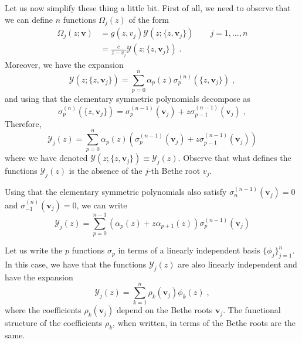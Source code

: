 \documentclass[a4paper,11pt]{amsart}
\begin{document}
Let us now simplify these thing a little bit. First of all, we need to
observe that we can define \(n\) functions \(\Omega_j(z)\) of the form 
\begin{equation}
\begin{split}
  \Omega_{j}(z; \bm{v}) & = g(z, v_j) \mathcal{Y}(z; \{z, \bm{v}_j\})\qquad j =1, \dots, n\\
   & = \frac{c}{z - v_j} \mathcal{Y}(z; \{z, \bm{v}_j\})\; .
\end{split}
\end{equation}
Moreover, we have the expansion 
\begin{equation}
  \mathcal{Y}(z; \{z,\bm{v}_j\}) = \sum_{p=0}^n \alpha_p(z) \sigma_p^{(n)}(\{z,\bm{v}_j\})\; , 
\end{equation}
and using that the elementary symmetric polynomials decompose as
\begin{equation}
  \sigma_p^{(n)}(\{z,\bm{v}_j\}) = \sigma_p^{(n-1)}(\bm{v}_j) + z \sigma_{p-1}^{(n-1)}(\bm{v}_j) \; , 
\end{equation}
Therefore,
\begin{equation}
  \label{eq:y-functions-alpha}
  \mathcal{Y}_j(z)  = 
\sum_{p=0}^{n} \alpha_p(z)
  \left(\sigma_p^{(n-1)}(\bm{v}_j) + z \sigma_{p-1}^{(n-1)}(\bm{v}_j) \right) 
\end{equation}
where we have denoted \( \mathcal{Y}(z; \{z,\bm{v}_j\}) \equiv \mathcal{Y}_j(z)\). 
Observe that what defines the functions \(\mathcal{Y}_j(z)\) is the absence of the
\(j\)-th Bethe root \(v_j\).

Using that the elementary symmetric polynomials also satisfy \(\sigma_n^{(n-1)}(\bm{v}_j)=0\)
and \(\sigma_{-1}^{(n)}(\bm{v}_j)= 0\), we can write
\begin{equation}
  \label{eq:y-functions}
  \mathcal{Y}_j(z)  = 
  \sum_{p=0}^{n-1} 
   \left(\alpha_p(z) + z \alpha_{p+1}(z) \right) \sigma_p^{(n-1)}(\bm{v}_j) 
\end{equation}

Let us write the \(p\) functions \(\sigma_p\) in terms of a linearly
independent basis \(\{\phi_j\}_{j=1}^n\). In this case, we have that the functions
\(\mathcal{Y}_j(z)\) are also linearly independent and have the expansion
\begin{equation}
  \mathcal{Y}_j(z) = \sum_{k=1}^n \rho_k(\bm{v}_j) \phi_k(z)\; ,
\end{equation}
where the coefficients \( \rho_k(\bm{v}_j)\) depend on the Bethe roots \(\bm{v}_j\). 
The functional structure of the coefficients \(\rho_k\), when written, in terms of the
Bethe roots are the same.  
\end{document}
